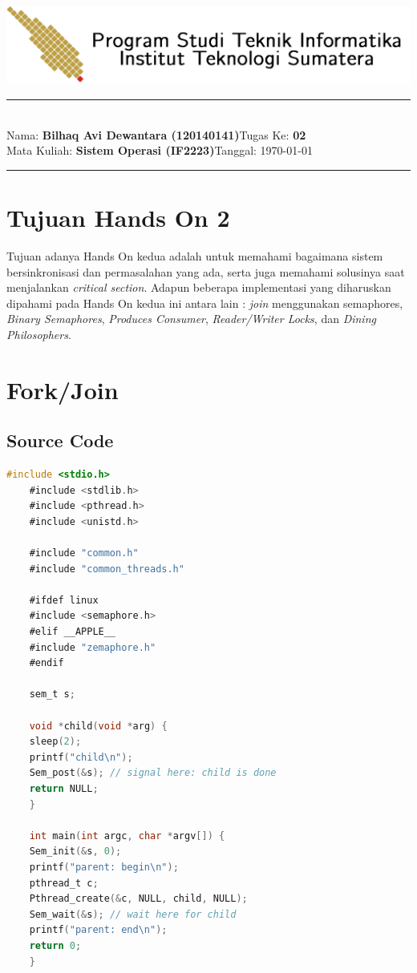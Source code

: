 \documentclass[11pt,a4paper]{article}
\newcommand{\stuid}{120140141}
\newcommand{\student}{\textbf{Bilhaq Avi Dewantara (\stuid{})}}
\newcommand{\course}{\textbf{Sistem Operasi (IF2223)}}
\newcommand{\assignment}{\textbf{02}} %
\begin{document}
\thispagestyle{empty}
\begin{center}
	\includegraphics[scale = 0.15]{Figure1/ifitera-header.png}
	\vspace{0.1cm}
\end{center}
\noindent
{\large
\rule{17cm}{0.2cm}\\[0.3cm]
Nama: \student \hfill Tugas Ke: \assignment\\[0.1cm]
Mata Kuliah: \course \hfill Tanggal: \today\\
\rule{17cm}{0.05cm}
\vspace{0.1cm}
}


\section{Tujuan Hands On 2}
    Tujuan adanya Hands On kedua adalah untuk memahami bagaimana sistem bersinkronisasi dan permasalahan yang ada, serta juga memahami solusinya saat menjalankan \textit{critical section}.
	Adapun beberapa implementasi yang diharuskan dipahami pada Hands On kedua ini antara lain : \textit{join} menggunakan semaphores, \textit{Binary Semaphores}, 
	\textit{Produces Consumer}, \textit{Reader/Writer Locks}, dan \textit{Dining Philosophers}.


\section{Fork/Join}
\subsection{Source Code}
\begin{lstlisting}[language=C]
	#include <stdio.h>
	#include <stdlib.h>
	#include <pthread.h>
	#include <unistd.h>

	#include "common.h"
	#include "common_threads.h"

	#ifdef linux
	#include <semaphore.h>
	#elif __APPLE__
	#include "zemaphore.h"
	#endif

	sem_t s;

	void *child(void *arg) {
	sleep(2);
	printf("child\n");
	Sem_post(&s); // signal here: child is done
	return NULL;
	}

	int main(int argc, char *argv[]) {
	Sem_init(&s, 0); 
	printf("parent: begin\n");
	pthread_t c;
	Pthread_create(&c, NULL, child, NULL);
	Sem_wait(&s); // wait here for child
	printf("parent: end\n");
	return 0;
	}
	\end{lstlisting}
\end{document}
